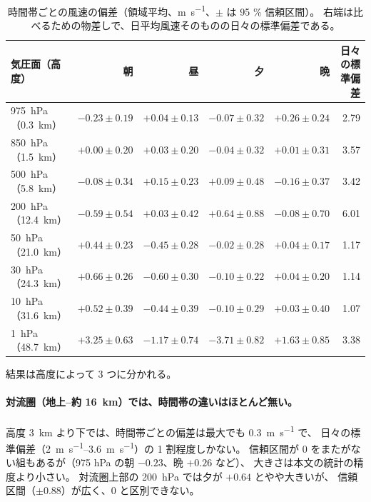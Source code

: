 \begin{table}[H]
\centering
\caption{時間帯ごとの風速の偏差（領域平均、\si{\metre\per\second}、$\pm$ は 95 \% 信頼区間）。
右端は比べるための物差しで、日平均風速そのものの日々の標準偏差である。}
\label{tab:era5-blocks}
\small
\begin{tabular}{@{}lrrrrr@{}}
\toprule
気圧面（高度） & {朝} & {昼} & {夕} & {晩} & {日々の標準偏差} \\
\midrule
\SI{975}{\hecto\pascal}（\SI{0.3}{\kilo\metre}） & $-0.23 \pm 0.19$ & $+0.04 \pm 0.13$ & $-0.07 \pm 0.32$ & $+0.26 \pm 0.24$ & 2.79 \\
\SI{850}{\hecto\pascal}（\SI{1.5}{\kilo\metre}） & $+0.00 \pm 0.20$ & $+0.03 \pm 0.20$ & $-0.04 \pm 0.32$ & $+0.01 \pm 0.31$ & 3.57 \\
\SI{500}{\hecto\pascal}（\SI{5.8}{\kilo\metre}） & $-0.08 \pm 0.34$ & $+0.15 \pm 0.23$ & $+0.09 \pm 0.48$ & $-0.16 \pm 0.37$ & 3.42 \\
\SI{200}{\hecto\pascal}（\SI{12.4}{\kilo\metre}） & $-0.59 \pm 0.54$ & $+0.03 \pm 0.42$ & $+0.64 \pm 0.88$ & $-0.08 \pm 0.70$ & 6.01 \\
\SI{50}{\hecto\pascal}（\SI{21.0}{\kilo\metre}） & $+0.44 \pm 0.23$ & $-0.45 \pm 0.28$ & $-0.02 \pm 0.28$ & $+0.04 \pm 0.17$ & 1.17 \\
\SI{30}{\hecto\pascal}（\SI{24.3}{\kilo\metre}） & $+0.66 \pm 0.26$ & $-0.60 \pm 0.30$ & $-0.10 \pm 0.22$ & $+0.04 \pm 0.20$ & 1.14 \\
\SI{10}{\hecto\pascal}（\SI{31.6}{\kilo\metre}） & $+0.52 \pm 0.39$ & $-0.44 \pm 0.39$ & $-0.10 \pm 0.29$ & $+0.03 \pm 0.40$ & 1.07 \\
\SI{1}{\hecto\pascal}（\SI{48.7}{\kilo\metre}） & $+3.25 \pm 0.63$ & $-1.17 \pm 0.74$ & $-3.71 \pm 0.82$ & $+1.63 \pm 0.85$ & 3.38 \\
\bottomrule
\end{tabular}
\end{table}

結果は高度によって 3 つに分かれる。

\paragraph{対流圏（地上--約 \SI{16}{\kilo\metre}）では、時間帯の違いはほとんど無い。}
高度 \SI{3}{\kilo\metre} より下では、時間帯ごとの偏差は最大でも \SI{0.3}{\metre\per\second} で、
日々の標準偏差（\SIrange{2}{3.6}{\metre\per\second}）の 1 割程度しかない。
信頼区間が 0 をまたがない組もあるが（975 hPa の朝 $-0.23$、晩 $+0.26$ など）、
大きさは本文の統計の精度より小さい。
対流圏上部の \SI{200}{\hecto\pascal} では夕が $+0.64$ とやや大きいが、
信頼区間（$\pm 0.88$）が広く、0 と区別できない。

